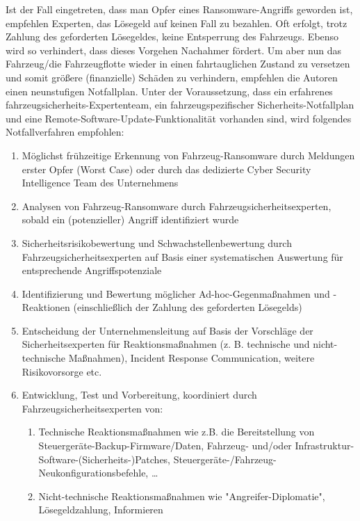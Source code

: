 Ist der Fall eingetreten, dass man Opfer eines Ransomware-Angriffs geworden ist, empfehlen Experten, 
das Lösegeld auf keinen Fall zu bezahlen. Oft erfolgt, trotz Zahlung des geforderten Lösegeldes, keine 
Entsperrung des Fahrzeugs. Ebenso wird so verhindert, dass dieses Vorgehen Nachahmer fördert. 
\newline
Um aber nun das Fahrzeug/die Fahrzeugflotte wieder in einen fahrtauglichen Zustand zu versetzen und 
somit größere (finanzielle) Schäden zu verhindern, empfehlen die Autoren einen neunstufigen Notfallplan. 
Unter der Voraussetzung, dass ein erfahrenes fahrzeugsicherheits-Expertenteam, ein fahrzeugspezifischer 
Sicherheits-Notfallplan und eine Remote-Software-Update-Funktionalität vorhanden sind, wird folgendes 
Notfallverfahren empfohlen:

\begin{enumerate}
    \item Möglichst frühzeitige Erkennung von Fahrzeug-Ransomware durch Meldungen erster Opfer (Worst Case) 
    oder durch das dedizierte Cyber Security Intelligence Team des Unternehmens
    \item Analysen von Fahrzeug-Ransomware durch Fahrzeugsicherheitsexperten, sobald ein (potenzieller) Angriff 
    identifiziert wurde
    \item Sicherheitsrisikobewertung und Schwachstellenbewertung durch Fahrzeugsicherheitsexperten auf Basis 
    einer systematischen Auswertung für entsprechende Angriffspotenziale 
    \item Identifizierung und Bewertung möglicher Ad-hoc-Gegenmaßnahmen und -Reaktionen (einschließlich der 
    Zahlung des geforderten Lösegelds)
    \item Entscheidung der Unternehmensleitung auf Basis der Vorschläge der Sicherheitsexperten für 
    Reaktionsmaßnahmen (z. B. technische und nicht-technische Maßnahmen), Incident Response Communication, 
    weitere Risikovorsorge etc.
    \item Entwicklung, Test und Vorbereitung, koordiniert durch Fahrzeugsicherheitsexperten von:
    \begin{enumerate}
        \item Technische Reaktionsmaßnahmen wie z.B. die Bereitstellung von Steuergeräte-Backup-Firmware/Daten, 
        Fahrzeug- und/oder Infrastruktur-Software-(Sicherheits-)Patches, Steuergeräte-/Fahrzeug-
        Neukonfigurationsbefehle, …
        \item Nicht-technische Reaktionsmaßnahmen wie "Angreifer-Diplomatie", Lösegeldzahlung, Informieren 

\end{enumerate}
\end{enumerate}
